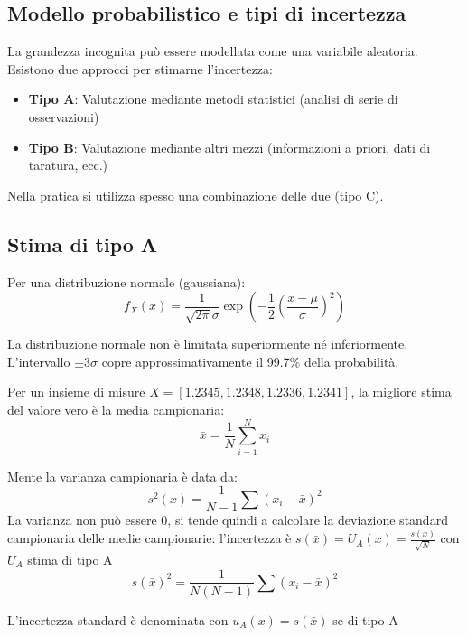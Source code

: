 \subsection{Modello probabilistico e tipi di incertezza}
La grandezza incognita può essere modellata come una variabile aleatoria. Esistono due approcci per stimarne l'incertezza:
\begin{itemize}
    \item \textbf{Tipo A}: Valutazione mediante metodi statistici (analisi di serie di osservazioni)
    \item \textbf{Tipo B}: Valutazione mediante altri mezzi (informazioni a priori, dati di taratura, ecc.)
\end{itemize}
Nella pratica si utilizza spesso una combinazione delle due (tipo C).

\subsection{Stima di tipo A}
Per una distribuzione normale (gaussiana):
\begin{equation}
    f_X(x) = \frac{1}{\sqrt{2\pi}\sigma} \exp\left(-\frac{1}{2}\left(\frac{x - \mu}{\sigma}\right)^2\right)
\end{equation}

La distribuzione normale non è limitata superiormente né inferiormente. L'intervallo $\pm 3\sigma$ copre approssimativamente il 99.7\% della probabilità.

Per un insieme di misure $X = [1.2345, 1.2348, 1.2336, 1.2341]$, la migliore stima del valore vero è la media campionaria:
\begin{equation}
    \bar{x} = \frac{1}{N} \sum_{i=1}^{N} x_i
\end{equation}

Mente la varianza campionaria è data da:
\begin{equation}
    s^2(x) = \frac{1}{N-1} \sum(x_i - \bar{x})^2
\end{equation}
La varianza non può essere 0, si tende quindi a calcolare la deviazione standard campionaria delle medie campionarie: l'incertezza è $s(\bar{x}) = U_A(x) = \frac{s(x)}{\sqrt{N}}$ con $U_A$ stima di tipo A
\begin{equation}
    s(\bar{x})^2 = \frac{1}{N(N-1)}\sum (x_i -\bar{x})^2
\end{equation}

L'incertezza standard è denominata con $u_A(x) = s(\bar{x})$ se di tipo A


